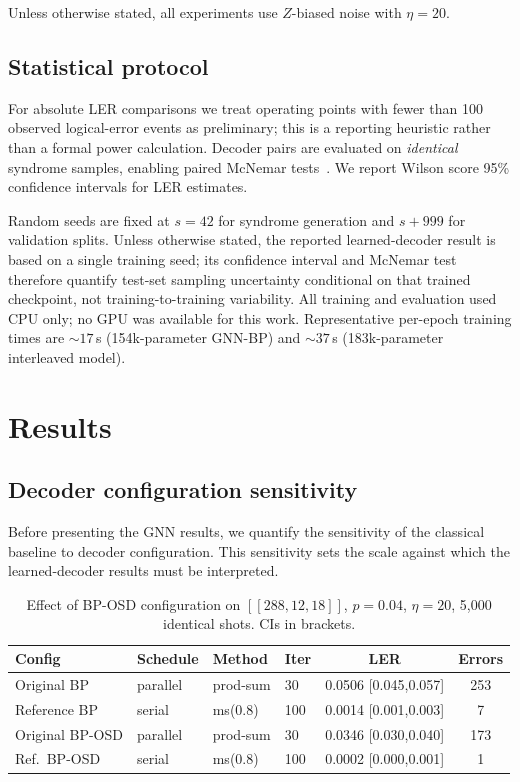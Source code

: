 \documentclass[a4paper,twocolumn,11pt,nopdfoutputerror]{quantumarticle}
\newcommand{\code}[3]{\ensuremath{[\![#1,#2,#3]\!]}}
\begin{document}
Unless otherwise stated, all experiments use $Z$-biased noise with
$\eta = 20$.

\subsection{Statistical protocol}

For absolute LER comparisons we treat operating points with fewer than
100 observed logical-error events as preliminary; this is a reporting
heuristic rather than a formal power calculation. Decoder pairs are
evaluated on \emph{identical} syndrome samples, enabling paired
McNemar tests~\cite{McNemar1947}. We report Wilson score 95\% confidence
intervals for LER estimates.

Random seeds are fixed at $s=42$ for syndrome generation and $s+999$ for
validation splits. Unless otherwise stated, the reported learned-decoder
result is based on a single training seed; its confidence interval and
McNemar test therefore quantify test-set sampling uncertainty conditional
on that trained checkpoint, not training-to-training variability. All
training and evaluation used CPU only; no GPU was available for this work.
Representative per-epoch training times are $\sim\!17$\,s
(154k-parameter GNN-BP) and $\sim\!37$\,s (183k-parameter
interleaved model).

\section{Results}\label{sec:results}

\subsection{Decoder configuration sensitivity}\label{sec:baseline}

Before presenting the GNN results, we quantify the sensitivity of the
classical baseline to decoder configuration. This sensitivity sets the
scale against which the learned-decoder results must be interpreted.

\begin{table}[t]
\centering
\caption{Effect of BP-OSD configuration on $\code{288}{12}{18}$,
         $p=0.04$, $\eta=20$, 5{,}000 identical shots. CIs in brackets.}
\label{tab:smoking_gun}
\begin{tabular}{@{}llllcc@{}}
\toprule
Config & Schedule & Method & Iter & LER & Errors \\
\midrule
Original BP     & parallel & prod-sum & 30  & 0.0506 [0.045,0.057] & 253 \\
Reference BP    & serial   & ms(0.8)  & 100 & 0.0014 [0.001,0.003] &   7 \\
Original BP-OSD & parallel & prod-sum & 30  & 0.0346 [0.030,0.040] & 173 \\
Ref.\ BP-OSD    & serial   & ms(0.8)  & 100 & 0.0002 [0.000,0.001] &   1 \\
\bottomrule
\end{tabular}
\end{table}
\end{document}
